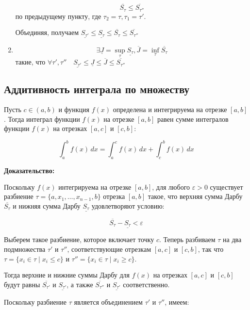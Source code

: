 \documentclass[a4paper]{article}
\begin{document}
\begin{definit}
\begin{enumerate}
\[
\overline{S_\tau} \leq \overline{S_{\tau''}}
\] по предыдущему пункту, где $\tau_2 = \tau, \tau_1 = \tau'$.

Объединяя, получаем $\underline{S_{\tau'}} \leq \underline{S_\tau} \leq \overline{S_\tau} \leq \overline{S_{\tau''}}$

\item \[
\exists \underline{J} = \sup_\tau \underline{S_\tau}, \overline{J} = \inf_\tau \overline{S_\tau}
\] такие, что $\forall \tau', 
\tau'' \quad \underline{S_{\tau'}} \leq \underline{J} \leq \overline{J} \leq \overline{S_{\tau''}} $

\end{enumerate}


\end{definit}



\begin{definit}
\hypertarget{p6}{}
\subsection*{Аддитивность интеграла по множеству}

Пусть $c \in (a, b)$ и функция $f(x)$ определена и интегрируема на отрезке $[a, b]$. Тогда интеграл функции $f(x)$ на отрезке $[a, b]$ равен сумме интегралов функции $f(x)$ на отрезках $[a, c]$ и $[c, b]$:

\[
\int_{a}^{b} f(x) \, dx = \int_{a}^{c} f(x) \, dx + \int_{c}^{b} f(x) \, dx
\]

\textbf{Доказательство:}

Поскольку $f(x)$ интегрируема на отрезке $[a, b]$, для любого $\varepsilon > 0$ существует разбиение $\tau = \{a, x_1, \dots, x_{n-1}, b\}$ отрезка $[a, b]$ такое, что верхняя сумма Дарбу $\overline{S_\tau}$ и нижняя сумма Дарбу $\underline{S_\tau}$ удовлетворяют условию:

\[
\overline{S_\tau} - \underline{S_\tau} < \varepsilon
\]

Выберем такое разбиение, которое включает точку $c$. Теперь разбиваем $\tau$ на два подмножества $\tau'$ и $\tau''$, соответствующие отрезкам $[a, c]$ и $[c, b]$, так что $\tau = \{x_i \in \tau \mid x_i \leq c\}$ и $\tau'' = \{x_i \in \tau \mid x_i \geq c\}$.

Тогда верхние и нижние суммы Дарбу для $f(x)$ на отрезках $[a, c]$ и $[c, b]$ будут равны $\overline{S_{\tau'}}$ и $\underline{S_{\tau'}}$, а также $\overline{S_{\tau''}}$ и $\underline{S_{\tau'}}$ соответственно.

Поскольку разбиение $\tau$ является объединением $\tau'$ и $\tau''$, имеем:


\end{definit}
\end{document}
